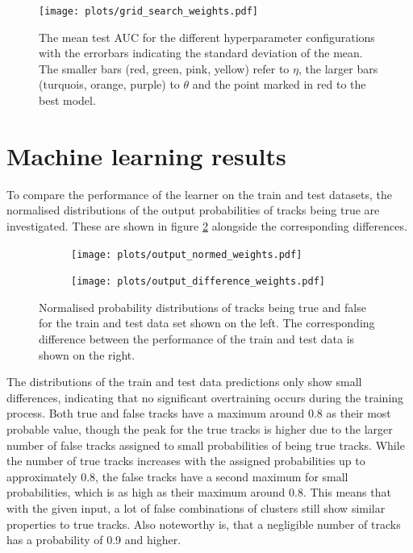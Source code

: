 \begin{figure}[H]
  \centering
  \texttt{[image: plots/grid\_search\_weights.pdf]}
  \caption{The mean test AUC for the different hyperparameter configurations with the errorbars indicating the standard deviation of the mean. The
  smaller bars (red, green, pink, yellow) refer to $\eta$, the larger bars (turquois, orange, purple) to $\theta$ and the point marked in red to the best model.}
  \label{fig:grid}
\end{figure}



\section{Machine learning results}
To compare the performance of the learner on the train and test datasets, the normalised distributions of the output probabilities of tracks being true are investigated.
These are shown in figure \ref{fig:output} alongside the corresponding differences.

\begin{figure}
  \hspace{-0.45cm}
  \begin{subfigure}{0.51\textwidth}
      \centering
      \texttt{[image: plots/output\_normed\_weights.pdf]}
  \end{subfigure}
  \begin{subfigure}{0.51\textwidth}
      \hspace{-0.15cm}
      \texttt{[image: plots/output\_difference\_weights.pdf]}
  \end{subfigure}
  \caption{Normalised probability distributions of tracks being true and false for the train and test data set shown on the left.
  The corresponding difference between the performance of the train and test data is shown on the right.}
  \label{fig:output}
\end{figure}

The distributions of the train and test data predictions only show small differences, indicating that no significant overtraining occurs during the training process.
Both true and false tracks have a maximum around 0.8 as their most probable value, though the peak for the true tracks is higher due to the larger number
of false tracks assigned to small probabilities of being true tracks. While the number of true tracks increases with the assigned probabilities up to
approximately 0.8, the false tracks have a second maximum for small probabilities, which is as high as their maximum around 0.8.
This means that
with the given input, a lot of false combinations of clusters still show similar properties to true tracks.
Also noteworthy is, that a negligible number of tracks has a probability of 0.9 and higher.


